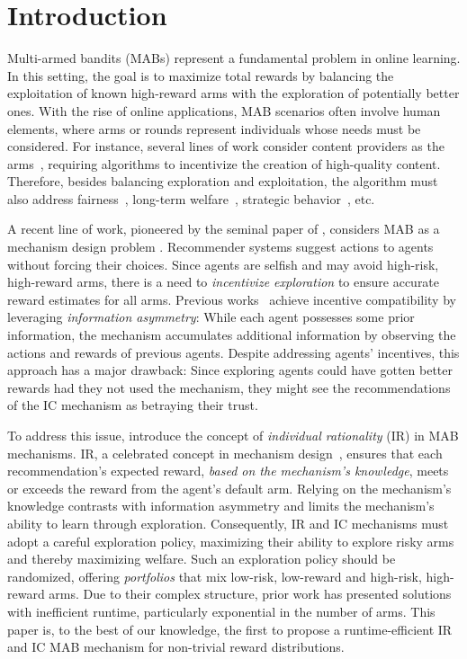 
\section{Introduction}\label{sec:intro}
Multi-armed bandits (MABs) represent a fundamental problem in online learning. In this setting, the goal is to maximize total rewards by balancing the exploitation of known high-reward arms with the exploration of potentially better ones. With the rise of online applications, MAB scenarios often involve human elements, where arms or rounds represent individuals whose needs must be considered. For instance, several lines of work consider content providers as the arms~\cite{hu2023incentivizing,ben2023learning,immorlica2024clickbait}, requiring algorithms to incentivize the creation of high-quality content. Therefore, besides balancing exploration and exploitation, the algorithm must also address fairness~\cite{MatthewKearnsMorgensternRothNIPS2016,liu2017calibrated}, long-term welfare~\cite{ben2023learning}, strategic behavior~\cite{braverman2019multi,feng2020intrinsic}, etc.



A recent line of work, pioneered by the seminal paper of \citet{Kremer2014}, considers MAB as a mechanism design problem \cite{nisan1999algorithmic, nisan2007algorithmic}. Recommender systems suggest actions to agents without forcing their choices. Since agents are selfish and may avoid high-risk, high-reward arms, there is a need to \emph{incentivize exploration} to ensure accurate reward estimates for all arms. Previous works~\cite{mansour2015bayesian,mansour2020bayesian,cohen2019optimal} achieve incentive compatibility by leveraging \emph{information asymmetry}: While each agent possesses some prior information, the mechanism accumulates additional information by observing the actions and rewards of previous agents. Despite addressing agents' incentives, this approach has a major drawback: Since exploring agents could have gotten better rewards had they not used the mechanism, they might see the recommendations of the IC mechanism as betraying their trust.

To address this issue, \citet{Fiduciary} introduce the concept of \emph{individual rationality} (IR) in MAB mechanisms. IR, a celebrated concept in mechanism design~\cite{tadelis2013game}, ensures that each recommendation's expected reward, \emph{based on the mechanism's knowledge}, meets or exceeds the reward from the agent's default arm. Relying on the mechanism's knowledge contrasts with information asymmetry and limits the mechanism's ability to learn through exploration. Consequently, IR and IC mechanisms must adopt a careful exploration policy, maximizing their ability to explore risky arms and thereby maximizing welfare. Such an exploration policy should be randomized, offering \emph{portfolios} that mix low-risk, low-reward and high-risk, high-reward arms. Due to their complex structure, prior work \cite{Fiduciary} has presented solutions with inefficient runtime, particularly exponential in the number of arms. This paper is, to the best of our knowledge, the first to propose a runtime-efficient IR and IC MAB mechanism for non-trivial reward distributions. 


